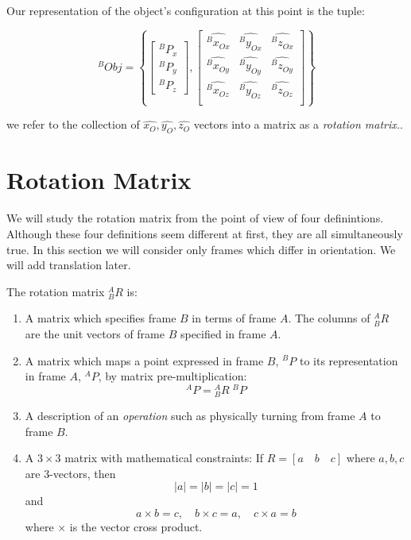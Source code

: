 Our representation of the object's configuration at this point is the tuple:

\[
^BObj = \left \{
\begin{bmatrix} ^BP_x \\ ^BP_y \\ ^BP_z \end{bmatrix},
\left [
\begin{array}{ccc}
\hat{^Bx_{Ox}}	&	\hat{^By_{Ox}}	&	\hat{^Bz_{Ox}} \\
\hat{^Bx_{Oy}}	&	\hat{^By_{Oy}}	&	\hat{^Bz_{Oy}} \\
\hat{^Bx_{Oz}}	&	\hat{^By_{Oz}}	&	\hat{^Bz_{Oz}} \\
\end{array}
\right]
\right \}
\]

we refer to the collection of $\hat{x_{O}}, \hat{y_O}, \hat{z_O}$ vectors into a matrix as a {\it rotation matrix.}.


\section{Rotation Matrix}\label{RotDefs}

We will study the rotation matrix from the point of view of four definintions.   Although these four definitions seem different at first, they are all simultaneously true. In this section we will consider only frames which differ in orientation.  We will add translation later.

The rotation matrix $^A_BR$  is:

\begin{enumerate}

	\item A matrix which specifies frame $B$ in terms of frame $A$.  The columns of $^A_BR$ are the unit vectors of frame $B$ specified in frame $A$.

	\item A matrix which maps a point expressed in frame $B$, $^BP$ to its representation in frame $A$, $^AP$, by matrix pre-multiplication:
\[
^AP = {}^A_BR \; ^BP
\]

	\item A description of an {\it operation} such as physically  turning from frame $A$ to frame $B$.

	\item A $3\times 3$ matrix with mathematical constraints:  If $R = [ a \quad b \quad c]$ where $a,b,c$ are 3-vectors, then
\[
|a| = |b| = |c| = 1
\]
and
\[
a \times b = c, \quad b \times c = a, \quad c\times a = b
\]
where $\times$ is the vector cross product.

\end{enumerate}

